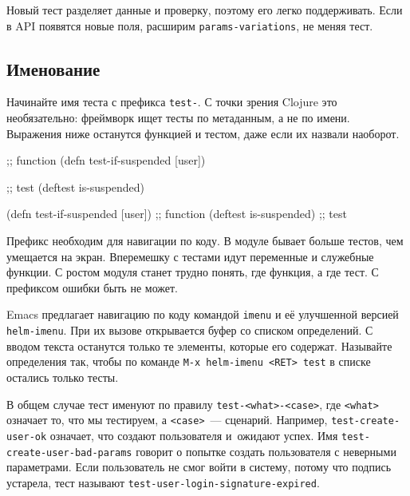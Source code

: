\fi

Новый тест разделяет данные и проверку, поэтому его легко поддерживать. Если в
API появятся новые поля, расширим \verb|params-variations|, не меняя тест.

\subsection{Именование}

Начинайте имя теста с префикса \verb|test-|. С точки зрения Clojure это
необязательно: фреймворк ищет тесты по метаданным, а не по имени. Выражения ниже
останутся функцией и тестом, даже если их назвали наоборот.

\ifnarrow

\begin{english}
  \begin{clojure}
;; function
(defn test-if-suspended [user])

;; test
(deftest is-suspended)
  \end{clojure}
\end{english}

\else

\begin{english}
  \begin{clojure}
(defn test-if-suspended [user]) ;; function
(deftest is-suspended)          ;; test
  \end{clojure}
\end{english}

\fi

Префикс необходим для навигации по коду. В модуле бывает больше тестов, чем
умещается на экран. Вперемешку с тестами идут переменные и служебные функции. С
ростом модуля станет трудно понять, где функция, а где тест. С префиксом ошибки
быть не может.


Emacs предлагает навигацию по коду командой \verb|imenu| и её улучшенной
версией \verb|helm-imenu|. При их вызове открывается буфер со списком
определений. С вводом текста останутся только те элементы, которые его
содержат. Называйте определения так, чтобы по команде \verb|M-x helm-imenu <RET> test|
в списке остались только тесты.

В общем случае тест именуют по правилу \texttt{test\--<what>\--<case>}, где
\verb|<what>| означает то, что мы тестируем, а \verb|<case>|~---
сценарий. Например, \verb|test-create-user-ok| означает, что создают
пользователя и~ожидают успех. Имя \verb|test-create-user-bad-params| говорит о
попытке создать пользователя с неверными параметрами. Если пользователь не смог
войти в систему, потому что подпись устарела, тест называют
\verb|test-user-login-signature-expired|.

